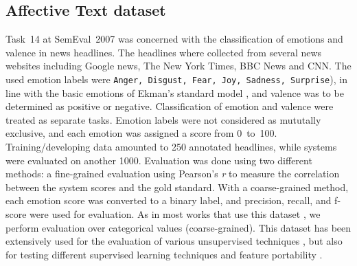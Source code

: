\documentclass[11pt]{article}
\begin{document}
\subsection{Affective Text dataset}
\label{sec:data:affect}
Task~14 at SemEval~2007  \cite{strapparava2007semeval} was concerned with the classification of emotions and valence in news headlines. The headlines where collected from several news websites including Google news,  The New York Times, BBC News and CNN. The used emotion labels were \texttt{Anger, Disgust, Fear, Joy, Sadness, Surprise}), in line with the basic emotions of Ekman's standard model \cite{ekman1992argument},
 and valence was to be determined as positive or negative. Classification of emotion and valence were treated as separate tasks. 
Emotion labels were not considered as mututally exclusive, and each emotion was assigned a score from 0~to~100. Training/developing data amounted to 250 annotated headlines, while systems were evaluated on another 1000. Evaluation was done using two different methods: a fine-grained evaluation using Pearson's \textit{r}  to measure the correlation between the system scores and the gold standard. With a coarse-grained method, each emotion score was converted to a binary label, and precision, recall, and f-score were used for evaluation. As in most works that use this dataset \cite{chaffar2011using,calvo2013emotions,kim2010evaluation}, we perform evaluation over categorical values (coarse-grained).  This dataset has been extensively used for the evaluation of various unsupervised techniques \cite{strapparava2008learning}, but also for testing different supervised learning techniques and feature portability \cite{mohammad:2012:NAACL-HLT}.

%
%

%
\end{document}
